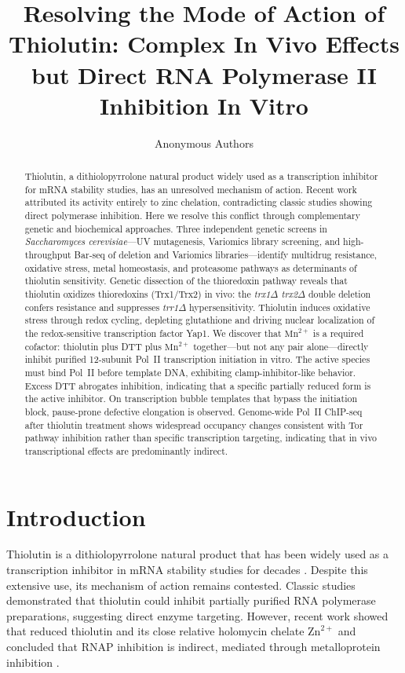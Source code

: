 \documentclass[11pt]{article}
\title{Resolving the Mode of Action of Thiolutin: Complex In Vivo Effects but Direct RNA Polymerase II Inhibition In Vitro}
\author{Anonymous Authors}
\date{}
\begin{document}
\maketitle

\begin{abstract}
Thiolutin, a dithiolopyrrolone natural product widely used as a transcription inhibitor for mRNA stability studies, has an unresolved mechanism of action. Recent work attributed its activity entirely to zinc chelation, contradicting classic studies showing direct polymerase inhibition. Here we resolve this conflict through complementary genetic and biochemical approaches. Three independent genetic screens in \textit{Saccharomyces cerevisiae}---UV mutagenesis, Variomics library screening, and high-throughput Bar-seq of deletion and Variomics libraries---identify multidrug resistance, oxidative stress, metal homeostasis, and proteasome pathways as determinants of thiolutin sensitivity. Genetic dissection of the thioredoxin pathway reveals that thiolutin oxidizes thioredoxins (Trx1/Trx2) in vivo: the \textit{trx1$\Delta$ trx2$\Delta$} double deletion confers resistance and suppresses \textit{trr1$\Delta$} hypersensitivity. Thiolutin induces oxidative stress through redox cycling, depleting glutathione and driving nuclear localization of the redox-sensitive transcription factor Yap1. We discover that $\text{Mn}^{2+}$ is a required cofactor: thiolutin plus DTT plus $\text{Mn}^{2+}$ together---but not any pair alone---directly inhibit purified 12-subunit Pol~II transcription initiation in vitro. The active species must bind Pol~II before template DNA, exhibiting clamp-inhibitor-like behavior. Excess DTT abrogates inhibition, indicating that a specific partially reduced form is the active inhibitor. On transcription bubble templates that bypass the initiation block, pause-prone defective elongation is observed. Genome-wide Pol~II ChIP-seq after thiolutin treatment shows widespread occupancy changes consistent with Tor pathway inhibition rather than specific transcription targeting, indicating that in vivo transcriptional effects are predominantly indirect.
\end{abstract}

\section{Introduction}

Thiolutin is a dithiolopyrrolone natural product that has been widely used as a transcription inhibitor in mRNA stability studies for decades \citep{tipper1973action, tokunaga1973thiolutin}. Despite this extensive use, its mechanism of action remains contested. Classic studies demonstrated that thiolutin could inhibit partially purified RNA polymerase preparations, suggesting direct enzyme targeting. However, recent work showed that reduced thiolutin and its close relative holomycin chelate $\text{Zn}^{2+}$ and concluded that RNAP inhibition is indirect, mediated through metalloprotein inhibition \citep{chan2017reduced}.
\end{document}
